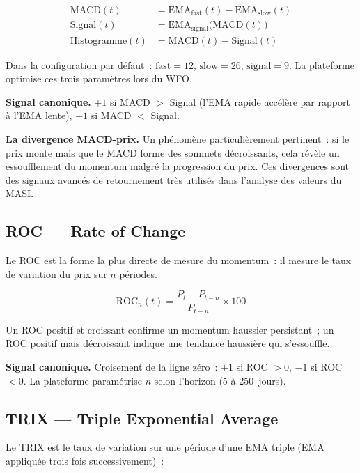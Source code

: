 \begin{align}
    \text{MACD}(t)     &= \text{EMA}_{\text{fast}}(t) - \text{EMA}_{\text{slow}}(t)
    \label{eq:macd_line} \\[4pt]
    \text{Signal}(t)   &= \text{EMA}_{\text{signal}}\!\bigl(\text{MACD}(t)\bigr)
    \label{eq:macd_signal} \\[4pt]
    \text{Histogramme}(t) &= \text{MACD}(t) - \text{Signal}(t)
    \label{eq:macd_hist}
\end{align}

Dans la configuration par défaut~: $\text{fast} = 12$, $\text{slow} = 26$,
$\text{signal} = 9$. La plateforme optimise ces trois paramètres lors du WFO.

\textbf{Signal canonique.}
$+1$ si MACD $>$ Signal (l'EMA rapide accélère par rapport à l'EMA lente),
$-1$ si MACD $<$ Signal.

\textbf{La divergence MACD-prix.}
Un phénomène particulièrement pertinent~: si le prix monte mais que le MACD forme
des sommets décroissants, cela révèle un essoufflement du momentum malgré la
progression du prix. Ces divergences sont des signaux avancés de retournement très
utilisés dans l'analyse des valeurs du MASI.

\subsection{ROC — Rate of Change}

Le ROC est la forme la plus directe de mesure du momentum~: il mesure le taux de
variation du prix sur $n$ périodes.

\begin{equation}
    \text{ROC}_n(t) = \frac{P_t - P_{t-n}}{P_{t-n}} \times 100
    \label{eq:roc}
\end{equation}

Un ROC positif et croissant confirme un momentum haussier persistant~; un ROC positif
mais décroissant indique une tendance haussière qui s'essouffle.

\textbf{Signal canonique.}
Croisement de la ligne zéro~: $+1$ si ROC $> 0$, $-1$ si ROC $< 0$.
La plateforme paramétrise $n$ selon l'horizon (5 à 250~jours).

\subsection{TRIX — Triple Exponential Average}

Le TRIX est le taux de variation sur une période d'une EMA triple (EMA appliquée
trois fois successivement)~:

